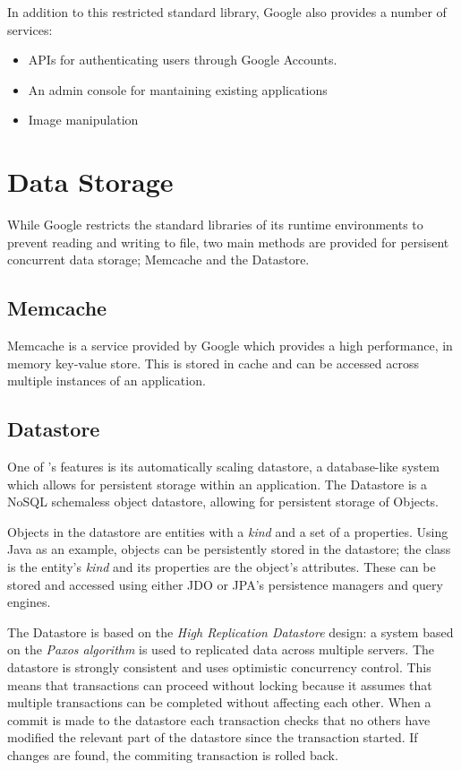 In addition to this restricted standard library, Google also provides a number of services:
\begin{itemize}
\item APIs for authenticating users through Google Accounts.
\item An admin console for mantaining existing applications
\item Image manipulation
\end{itemize}

\section{Data Storage}
While Google restricts the standard libraries of its runtime environments to prevent reading and writing to file, two main methods are provided for persisent concurrent data storage; Memcache and the Datastore.

\subsection{Memcache}
Memcache is a service provided by Google which provides a high performance, in memory key-value store. This is stored in cache and can be accessed across multiple instances of an application.

\subsection{Datastore}
One of \gae{}'s features is its automatically scaling datastore, a database-like system which allows for persistent storage within an application. The Datastore is a NoSQL schemaless object datastore, allowing for persistent storage of Objects. 

Objects in the datastore are entities with a \emph{kind} and a set of a properties. Using Java as an example, objects can be persistently stored in the datastore; the class is the entity's \emph{kind} and its properties are the object's attributes. These can be stored and accessed using either JDO or JPA's persistence managers and query engines.

The Datastore is based on the \emph{High Replication Datastore} design: a system based on the \emph{Paxos algorithm} is used to replicated data across multiple servers. The datastore is strongly consistent and uses optimistic concurrency control. This means that transactions can proceed without locking because it assumes that multiple transactions can be completed without affecting each other. When a commit is made to the datastore each transaction checks that no others have modified the relevant part of the datastore since the transaction started. If changes are found, the commiting transaction is rolled back.
 
